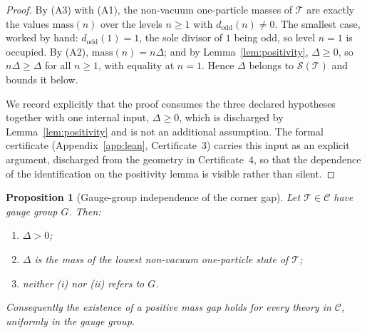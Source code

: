 \documentclass[11pt,a4paper]{article}
\newcommand{\dodd}{d_{\mathrm{odd}}}
\newcommand{\class}{\mathcal{C}}
\newcommand{\thy}{\mathcal{T}}
\theoremstyle{plain}
\newtheorem{proposition}[theorem]{Proposition}
\theoremstyle{definition}
\theoremstyle{remark}
\begin{document}
\begin{proof}
By (A3) with (A1), the non-vacuum one-particle masses of $\thy$ are
exactly the values $\mathrm{mass}(n)$ over the levels $n \ge 1$ with
$\dodd(n) \ne 0$. The smallest case, worked by hand: $\dodd(1) = 1$,
the sole divisor of $1$ being odd, so level $n = 1$ is occupied. By
(A2), $\mathrm{mass}(n) = n\Delta$; and by
Lemma~\ref{lem:positivity}, $\Delta \ge 0$, so $n\Delta \ge \Delta$
for all $n \ge 1$, with equality at $n = 1$. Hence $\Delta$ belongs
to $\mathcal{S}(\thy)$ and bounds it below.

We record explicitly that the proof consumes the three declared
hypotheses together with one internal input, $\Delta \ge 0$, which is
discharged by Lemma~\ref{lem:positivity} and is not an additional
assumption. The formal certificate (Appendix~\ref{app:lean},
Certificate~3) carries this input as an explicit argument, discharged
from the geometry in Certificate~4, so that the dependence of the
identification on the positivity lemma is visible rather than
silent.
\end{proof}

\begin{proposition}[Gauge-group independence of the corner
gap]\label{prop:transfer}
Let $\thy \in \class$ have gauge group $G$. Then:
\begin{enumerate}[label=\textup{(\roman*)}]
\item $\Delta > 0$;
\item $\Delta$ is the mass of the lowest non-vacuum one-particle
  state of $\thy$;
\item neither \textup{(i)} nor \textup{(ii)} refers to $G$.
\end{enumerate}
Consequently the existence of a positive mass gap holds for every
theory in $\class$, uniformly in the gauge group.
\end{proposition}
\end{document}
